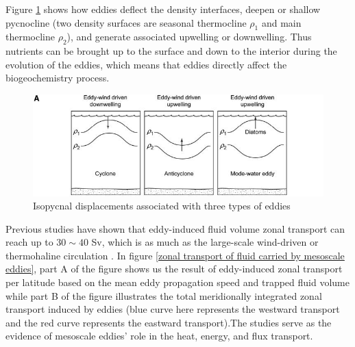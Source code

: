 	
Figure \ref{Plankton Bloom} shows how eddies deflect the density interfaces, deepen or shallow pycnocline (two density surfaces are seasonal thermocline $\rho_1$ and main thermocline $\rho_2$), and generate associated upwelling or downwelling. Thus nutrients can be brought up to the surface and down to the interior during the evolution of the eddies, which means that eddies directly affect the biogeochemistry process.

\begin{figure}[ht]
  \centering
  \includegraphics[width=15cm]{chapter/figure/Plankton Blooms.jpg}
  \caption
  {Isopycnal displacements associated with three types of eddies \cite{mcgillicuddy2007eddy}} 
  \label{Plankton Bloom}
\end{figure}

Previous studies have shown that eddy-induced fluid volume zonal transport can reach up to $ 30\sim40 $ Sv, which is as much as the large-scale wind-driven or  thermohaline circulation \cite{zhang2014oceanic}. In figure \ref{zonal transport of fluid carried by mesoscale eddies}, part A of the figure shows us the result of eddy-induced zonal transport per latitude based on the mean eddy propagation speed and trapped fluid volume while part B of the figure illustrates the total meridionally integrated zonal transport induced by eddies (blue curve here represents the westward transport and the red curve represents the eastward transport).The studies serve as the evidence of mesoscale eddies' role in the heat, energy, and flux transport.

